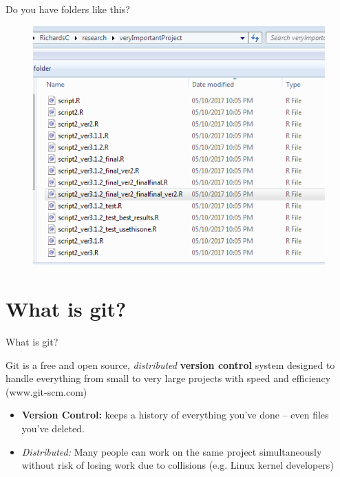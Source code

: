 \documentclass{beamer}
\begin{document}
\begin{frame}

  Do you have folders like this?
  \begin{figure}
    \centering
    \includegraphics[height=0.9\textheight]{versioncontrol}
  \end{figure}

\end{frame}

\section{What is git?}

\begin{frame}{What is git?}

  Git is a free and open source, {\it distributed} {\bf version
    control} system designed to handle everything from small to very
  large projects with speed and efficiency (www.git-scm.com)
  \vspace{2em}
  \begin{itemize}
  \item {\bf Version Control:} keeps a history of everything you've
    done -- even files you've deleted.
  \item {\it Distributed:} Many people can work on the same project
    simultaneously without risk of losing work due to collisions
    (e.g. Linux kernel developers)
  \end{itemize}
\end{frame}
\end{document}
